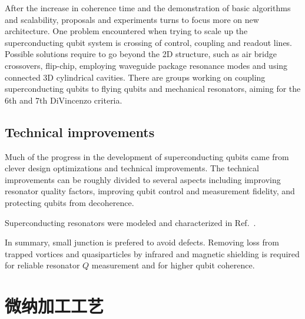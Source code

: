 After the increase in coherence time and the demonstration of basic algorithms and scalability, proposals and experiments turns to focus more on new architecture. One problem encountered when trying to scale up the superconducting qubit system is crossing of control, coupling and readout lines. Possible solutions require to go beyond the 2D structure, such as air bridge crossovers\cite{Versluis2016}, flip-chip\cite{Yorozu2006}, employing waveguide package resonance modes\cite{Minev2016} and using connected 3D cylindrical cavities\cite{Axline2016}. There are groups working on coupling superconducting qubits to flying qubits and mechanical resonators\cite{Palomaki2013,Reed2017,Keller2017}, aiming for the 6th and 7th DiVincenzo criteria.




\section{Technical improvements} %
\label{sec:technical_improvements}

Much of the progress in the development of superconducting qubits came from clever design optimizations and technical improvements. The technical improvements can be roughly divided to several aspects including improving resonator quality factors, improving qubit control and measurement fidelity, and protecting qubits from decoherence.


Superconducting resonators were modeled and characterized in Ref.~.


In summary, small junction is prefered to avoid defects. Removing loss from trapped vortices and quasiparticles by infrared and magnetic shielding is required for reliable resonator $Q$ measurement and for higher qubit coherence.











\chapter{微纳加工工艺} %
\label{cha:fabrication}

